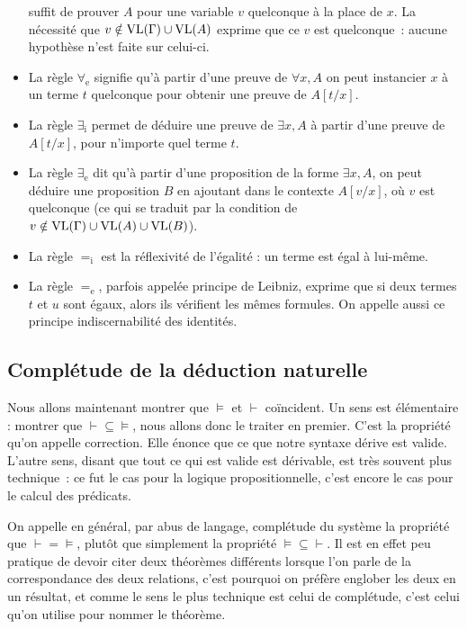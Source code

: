 \begin{itemize}
  suffit de prouver $A$ pour une variable $v$ quelconque à la place de $x$. La
  nécessité que $v\notin\operatorname{VL}(\Gamma)\cup\operatorname{VL}(A)$ exprime que ce $v$ est
  quelconque~: aucune hypothèse n'est faite sur celui-ci.
\item La règle $\forall_\mathrm e$ signifie qu'à partir d'une preuve de
  $\forall x, A$ on peut instancier $x$ à un terme $t$ quelconque pour obtenir
  une preuve de $A[t/x]$.
\item La règle $\exists_\mathrm i$ permet de déduire une preuve de $\exists x,A$
  à partir d'une preuve de $A[t/x]$, pour n'importe quel terme $t$.
\item La règle $\exists_\mathrm e$ dit qu'à partir d'une proposition de la forme
  $\exists x, A$, on peut déduire une proposition $B$ en ajoutant dans le
  contexte $A[v/x]$, où $v$ est quelconque (ce qui se traduit par la condition
  de $v\notin\operatorname{VL}(\Gamma)\cup\operatorname{VL}(A)\cup\operatorname{VL}(B)$).
\item La règle $=_\mathrm i$ est la réflexivité de l'égalité : un terme est
  égal à lui-même.
\item La règle $=_\mathrm e$, parfois appelée principe de Leibniz, exprime que
  si deux termes $t$ et $u$ sont égaux, alors ils vérifient les mêmes formules.
  On appelle aussi ce principe \og indiscernabilité des identités\fg{}.
\end{itemize}

\subsection[Théorème de complétude]{Complétude de la déduction naturelle}

Nous allons maintenant montrer que $\vDash$ et $\vdash$ coïncident. Un sens est
élémentaire : montrer que $\vdash \subseteq\vDash$, nous allons donc le traiter
en premier. C'est la propriété qu'on appelle correction. Elle énonce que ce que
notre syntaxe dérive est valide. L'autre sens, disant que tout ce qui est
valide est dérivable, est très souvent plus technique~: ce fut le cas pour
la logique propositionnelle, c'est encore le cas pour le calcul des prédicats.

On appelle en général, par abus de langage, complétude du système la propriété
que $\vdash = \vDash$, plutôt que simplement la propriété
$\vDash\subseteq\vdash$. Il est en effet peu pratique de devoir citer deux
théorèmes différents lorsque l'on parle de la correspondance des deux relations,
c'est pourquoi on préfère englober les deux en un résultat, et comme le sens le
plus technique est celui de complétude, c'est celui qu'on utilise pour nommer le
théorème.

